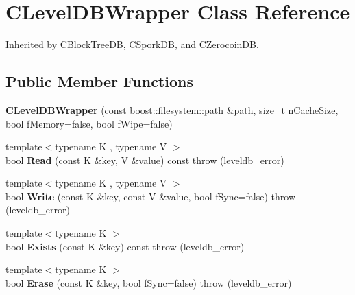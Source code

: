 \hypertarget{class_c_level_d_b_wrapper}{}\section{C\+Level\+D\+B\+Wrapper Class Reference}
\label{class_c_level_d_b_wrapper}


Inherited by \mbox{\hyperlink{class_c_block_tree_d_b}{C\+Block\+Tree\+DB}}, \mbox{\hyperlink{class_c_spork_d_b}{C\+Spork\+DB}}, and \mbox{\hyperlink{class_c_zerocoin_d_b}{C\+Zerocoin\+DB}}.

\subsection*{Public Member Functions}
\begin{DoxyCompactItemize}
\item 
\mbox{\label{class_c_level_d_b_wrapper_ae796b1190c072df6275e0ada4d187943}} 
{\bfseries C\+Level\+D\+B\+Wrapper} (const boost\+::filesystem\+::path \&path, size\+\_\+t n\+Cache\+Size, bool f\+Memory=false, bool f\+Wipe=false)
\item 
\mbox{\label{class_c_level_d_b_wrapper_a0cb51d3b8f042641b2d0aa76c3185527}} 
{\footnotesize template$<$typename K , typename V $>$ }\\bool {\bfseries Read} (const K \&key, V \&value) const  throw (leveldb\+\_\+error)
\item 
\mbox{\label{class_c_level_d_b_wrapper_a740caa1aefbafc888838ea7f70dc31f4}} 
{\footnotesize template$<$typename K , typename V $>$ }\\bool {\bfseries Write} (const K \&key, const V \&value, bool f\+Sync=false)  throw (leveldb\+\_\+error)
\item 
\mbox{\label{class_c_level_d_b_wrapper_a43c427da8e32af87a09d3cb60353ef0e}} 
{\footnotesize template$<$typename K $>$ }\\bool {\bfseries Exists} (const K \&key) const  throw (leveldb\+\_\+error)
\item 
\mbox{\label{class_c_level_d_b_wrapper_a9f67e2880ba191fdc9439ba34e315d72}} 
{\footnotesize template$<$typename K $>$ }\\bool {\bfseries Erase} (const K \&key, bool f\+Sync=false)  throw (leveldb\+\_\+error)

\end{DoxyCompactItemize}
